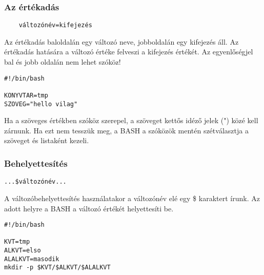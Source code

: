 \subsubsection*{Az értékadás}
\begin{verbatim}
	változónév=kifejezés
\end{verbatim}
Az értékadás baloldalán egy változó neve, jobboldalán egy kifejezés áll. Az értékadás hatására a változó értéke felveszi a kifejezés
értékét. Az egyenlőségjel bal és jobb oldalán nem lehet szóköz!
\bigskip

\begin{lstlisting}
#!/bin/bash

KONYVTAR=tmp
SZOVEG="hello vilag"
\end{lstlisting}

Ha a szöveges értékben szóköz szerepel, a szöveget kettős idéző jelek (") közé kell zárnunk. Ha ezt nem tesszük meg, a BASH a szóközök mentén szétválasztja a szöveget és listaként kezeli.


\subsubsection*{Behelyettesítés}
\begin{verbatim}
...$változónév...
\end{verbatim}
A változóbehelyettesítés használatakor a változónév elé egy \$ karaktert írunk. Az adott helyre a BASH a változó értékét helyettesíti be.

\begin{lstlisting}
#!/bin/bash

KVT=tmp
ALKVT=elso
ALALKVT=masodik
mkdir -p $KVT/$ALKVT/$ALALKVT
\end{lstlisting}


